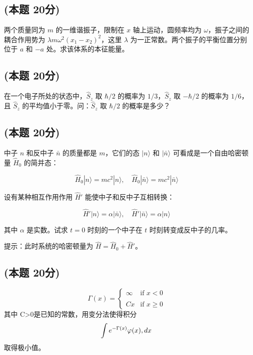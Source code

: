 \subsection{(本题 20分)}
两个质量同为 $m$ 的一维谐振子，限制在 $x$ 轴上运动，圆频率均为 $\omega$，振子之间的耦合作用势为 $\lambda m \omega^2 (x_1 - x_2)^2$，这里 $\lambda$ 为一正常数。两个振子的平衡位置分别位于 $a$ 和 $-a$ 处。求该体系的本征能量。
\subsection{(本题 20分)}
在一个电子所处的状态中，$\hat S_z$ 取 $\hbar/2$ 的概率为 $1/3$，$\hat S_z$ 取 $-\hbar/2$ 的概率为 $1/6$，且 $\hat S_z$ 的平均值小于零。问：$\hat S_z$ 取 $\hbar/2$ 的概率是多少？
\subsection{(本题 20分)}
中子 $n$ 和反中子 $\bar{n}$ 的质量都是 $m$，它们的态 $|n\rangle$ 和 $|\bar{n}\rangle$ 可看成是一个自由哈密顿量 $\hat H_0$ 的简并态：

$$\hat H_0|n\rangle = mc^2|n\rangle, \quad \hat H_0|\bar{n}\rangle = mc^2|\bar{n}\rangle~$$

设有某种相互作用作用 $\hat H'$ 能使中子和反中子互相转换：

$$\hat H'|n\rangle = \alpha|\bar{n}\rangle, \quad \hat H'|\bar{n}\rangle = \alpha|n\rangle~$$

其中 $\alpha$ 是实数。试求 $t=0$ 时刻的一个中子在 $t$ 时刻转变成反中子的几率。

提示：此时系统的哈密顿量为 $\hat{H} = \hat{H}_0 + \hat{H}'$。
\subsection{(本题 20分)}
$$\Gamma(x) = \begin{cases} \infty & \text{if } x < 0 \\\\ Cx & \text{if } x \geq 0\end{cases}~$$
其中 C>0是已知的常数，用变分法使得积分
$$\int e^{-\Gamma(x)} \varphi(x) \\, dx~$$
取得极小值。

